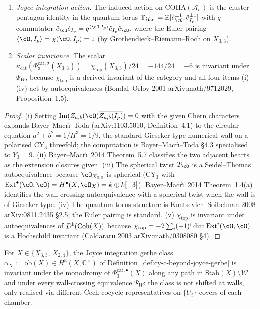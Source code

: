 \begin{proposition}
\begin{enumerate}[label=\textup{(\roman*)}]
 \item \emph{Joyce-integration action.} The induced action on
 $\mathrm{COHA}(\mathcal A_\sigma)$ is the cluster pentagon
 identity in the quantum torus
 $\mathbb T_{\mathcal H_W} = \mathbb Z[\hat{e}_{\cO}^{\pm 1},
 \hat{e}_{I_p}^{\pm 1}]$ with $q$-commutator
 $\hat{e}_{\cO} \hat{e}_{I_p} = q^{\langle \cO, I_p \rangle}
 \hat{e}_{I_p} \hat{e}_{\cO}$, where the Euler pairing
 $\langle \cO, I_p \rangle = \chi(\cO, I_p) = 1$ (by
 Grothendieck--Riemann--Roch on $X_{3,3}$).
 \item \emph{Scalar invariance.} The scalar
 $\kappa_{\mathrm{cat}}(\Phi_3^{\mathrm{cat},\sigma}(X_{3,3}))
 = \chi_{\mathrm{top}}(X_{3,3})/24 = -144/24 = -6$ is invariant
 under $\Psi_W$, because $\chi_{\mathrm{top}}$ is a
 derived-invariant of the category and all four items (i)--(iv)
 act by autoequivalences (Bondal--Orlov 2001 arXiv:math/9712029,
 Proposition~1.5).
\end{enumerate}
\end{proposition}

\begin{proof}
(i) Setting $\mathrm{Im}(Z_{a,b}(\cO) \overline{Z_{a,b}(I_p)}) = 0$
with the given Chern characters expands Bayer--Macr\`\i--Toda
(arXiv:1103.5010, Definition~4.1) to the circular equation
$a^2 + b^2 = 1/H^3 = 1/9$, the standard Gieseker-type numerical wall
on a polarised CY$_3$ threefold; the computation is Bayer--Macr\`\i--Toda
\S 4.3 specialised to $Y_3 = 9$. (ii) Bayer--Macr\`\i\ 2014 Theorem~5.7
classifies the two adjacent hearts as the extension closures given.
(iii) The spherical twist $T_{\cO}$ is a Seidel--Thomas autoequivalence
because $\cO_{X_{3,3}}$ is spherical
(CY$_3$ with $\mathrm{Ext}^\bullet(\cO, \cO) = H^\bullet(X, \cO_X) =
k \oplus k[-3]$). Bayer--Macr\`\i\ 2014 Theorem~1.4(a) identifies the
wall-crossing autoequivalence with a spherical twist when the wall is
of Gieseker type. (iv) The quantum torus structure is
Kontsevich--Soibelman 2008 arXiv:0811.2435 \S 2.5; the Euler pairing
is standard. (v) $\chi_{\mathrm{top}}$ is invariant under
autoequivalences of $D^b(\mathrm{Coh}(X))$ because
$\chi_{\mathrm{top}} = -2 \sum_i (-1)^i \dim \mathrm{Ext}^i(\cO, \cO)$
is a Hochschild invariant (Caldararu 2003 arXiv:math/0308080 \S 4).
\end{proof}

\begin{proposition}
\label{prop:cy-c-bicubic-24CI-alpha-X-monodromy-invariant}
For $X \in \{X_{3,3},\, X_{2,4}\}$, the Joyce integration gerbe class
$\alpha_X := \mathrm{ob}(X) \in H^3(X, \mathbb C^\times)$ of
Definition~\ref{def:cy-c-beyond-joyce-gerbe} is invariant under the
monodromy of $\Phi_3^{\mathrm{cat},\bullet}(X)$ along any path in
$\mathrm{Stab}(X) \setminus \mathcal W$ and under every wall-crossing
equivalence $\Psi_W$: the class is not shifted at walls, only
realised via different \v{C}ech cocycle representatives on
$\{U_i\}$-covers of each chamber.
\end{proposition}

